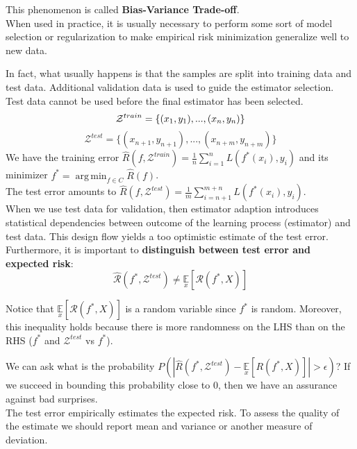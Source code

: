 \documentclass[twoside]{article}
\DeclareMathOperator*{\argmin}{arg\,min}
\begin{document}
This phenomenon is called \textbf{Bias-Variance Trade-off}.\\
When used in practice, it is usually necessary to perform some sort of model selection or regularization to make empirical risk minimization generalize well to new data.\medskip

In fact, what usually happens is that the samples are split into training data and test data. Additional validation data is used to guide the estimator selection.\\
Test data cannot be used before the final estimator has been selected.
\begin{equation*}
    \mathcal{Z}^{train} = \{(x_1, y_1),...,(x_n, y_n)\}\\
\end{equation*}
\begin{equation*}
    \mathcal{Z}^{test} = \{(x_{n+1}, y_{n+1}),...,(x_{n+m}, y_{n+m})\}
\end{equation*}
We have the training error $\hat{R}(f, \mathcal{Z}^{train}) = \frac{1}{n}\sum\limits_{i = 1}^{n}L(f^*(x_i), y_i)$ and its minimizer $f^* = \argmin_{f \in C} \hat{R}(f)$.\\
The test error amounts to $\hat{R}(f, \mathcal{Z}^{test}) = \frac{1}{m}\sum\limits_{i = n+1}^{m+n}L(f^*(x_i), y_i)$.\\
When we use test data for validation, then estimator adaption introduces statistical dependencies between outcome of the learning process (estimator) and test data. This design flow yields a too optimistic estimate of the test error.\\
Furthermore, it is important to \textbf{distinguish between test error and expected risk}:
\begin{equation*}
    \hat{\mathcal{R}}(f^*, \mathcal{Z}^{test}) \neq \underset{x}{\mathbb{E}}[\mathcal{R}(f^*, X)]
\end{equation*}

Notice that $\underset{x}{\mathbb{E}}[\mathcal{R}(f^*, X)]$ is a random variable since $f^*$ is random. Moreover,  this inequality holds because there is more randomness on the LHS than on the RHS ($f^*$ and $\mathcal{Z}^{test}$ vs $f^*$). 

We can ask what is the probability $P(|\hat{R}(f^*, \mathcal{Z}^{test})-\underset{x}{\mathbb{E}}[R(f^*, X)]|> \epsilon)$? If we succeed in bounding this probability close to 0, then we have an assurance against bad surprises. \\
The test error empirically estimates the expected risk. To assess the quality of the estimate we should report mean and variance or another measure of deviation.
\end{document}
